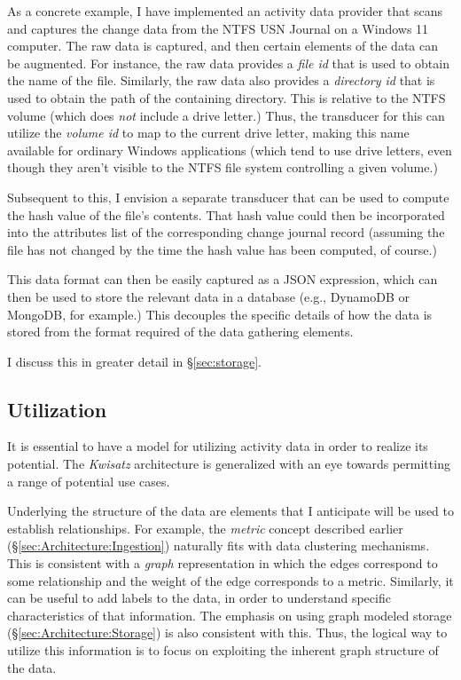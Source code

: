 \documentclass[sigconf,anonymous,review]{acmart}
\newcommand{\system}[0]{\emph{Kwisatz}\xspace}
\begin{document}
As a concrete example, I have implemented an activity data provider that scans
and captures the change data from the NTFS USN Journal on a Windows 11 computer.
The raw data is captured, and then certain elements of the data can be
augmented.  For instance, the raw data provides a \emph{file id} that is used to
obtain the name of the file.  Similarly, the raw data also provides a
\emph{directory id} that is used to obtain the path of the containing directory.
This is relative to the NTFS volume (which does \emph{not} include a drive
letter.)  Thus, the transducer for this can utilize the \emph{volume id} to map
to the current drive letter, making this name available for ordinary Windows
applications (which tend to use drive letters, even though they aren't visible
to the NTFS file system controlling a given volume.)

Subsequent to this, I envision a separate transducer that can be used to compute
the hash value of the file's contents.  That hash value could then be
incorporated into the attributes list of the corresponding change journal record
(assuming the file has not changed by the time the hash value has been computed,
of course.)

This data format can then be easily captured as a JSON expression, which can
then be used to store the relevant data in a database (e.g., DynamoDB or
MongoDB, for example.)  This decouples the specific details of how the data is
stored from the format required of the data gathering elements.

I discuss this in greater detail in \S \ref{sec:storage}.

\subsection{Utilization}
\label{sec:Architecture:Utilization}

It is essential to have a model for utilizing activity data in order to realize
its potential.  The \system architecture is generalized with an eye towards
permitting a range of potential use cases.

Underlying the structure of the data are elements that I anticipate will be used
to establish relationships.  For example, the \emph{metric} concept described
earlier (\S \ref{sec:Architecture:Ingestion}) naturally fits with data
clustering mechanisms.  This is consistent with a \emph{graph} representation in
which the edges correspond to some relationship and the weight of the edge
corresponds to a metric. Similarly, it can be useful to add labels to the data,
in order to understand specific characteristics of that information.  The
emphasis on using graph modeled storage (\S \ref{sec:Architecture:Storage}) is
also consistent with this.  Thus, the logical way to utilize this information is
to focus on exploiting the inherent graph structure of the data.
\end{document}
